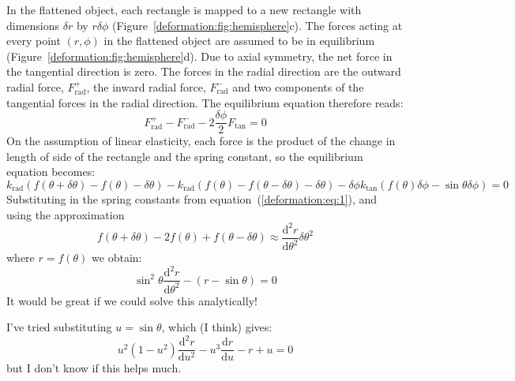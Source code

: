 \documentclass{article}
\begin{document}
In the flattened object, each rectangle is mapped to a new rectangle
with dimensions $\delta r$ by $r\delta\phi$
(Figure~\ref{deformation:fig:hemisphere}c). The forces acting at every
point $(r, \phi)$ in the flattened object are assumed to be in
equilibrium (Figure~\ref{deformation:fig:hemisphere}d). Due to axial
symmetry, the net force in the tangential direction is zero. The
forces in the radial direction are the outward radial force,
$F^+_\mathrm{rad}$, the inward radial force, $F^-_\mathrm{rad}$ and
two components of the tangential forces in the radial direction. The
equilibrium equation therefore reads:
\begin{displaymath}
  F^+_\mathrm{rad} - F^-_\mathrm{rad} -
  2\frac{\delta\phi}{2}F_\mathrm{tan} = 0
\end{displaymath}
On the assumption of linear elasticity, each force is the product of
the change in length of side of the rectangle and the spring constant,
so the equilibrium equation becomes:
\begin{displaymath}
  k_\mathrm{rad}(f(\theta+\delta\theta)-f(\theta) - \delta\theta) 
  - k_\mathrm{rad}(f(\theta)- f(\theta-\delta\theta) - \delta\theta) 
 - \delta\phi  k_\mathrm{tan} (f(\theta) \delta\phi - \sin\theta
 \delta\phi) = 0
\end{displaymath}
Substituting in the spring constants from
equation~(\ref{deformation:eq:1}), and using the approximation
\begin{displaymath}
f(\theta+\delta\theta)-2f(\theta)+f(\theta-\delta\theta)\approx
\frac{\mathrm{d}^2r}{\mathrm{d}\theta^2}\delta\theta^2
\end{displaymath}
where $r=f(\theta)$ we obtain:
\begin{displaymath}
  \sin^2\theta \frac{\mathrm{d}^2r}{\mathrm{d}\theta^2}
  - (r - \sin\theta)=0
\end{displaymath}
It would be great if we could solve this analytically!

I've tried substituting $u=\sin\theta$, which (I think) gives:
\begin{displaymath}
  u^2(1-u^2) \frac{\mathrm{d}^2r}{\mathrm{d}u^2} 
  -u^3 \frac{\mathrm{d}r}{\mathrm{d}u} 
  -r + u = 0
\end{displaymath}
but I don't know if this helps much.



\end{document}
